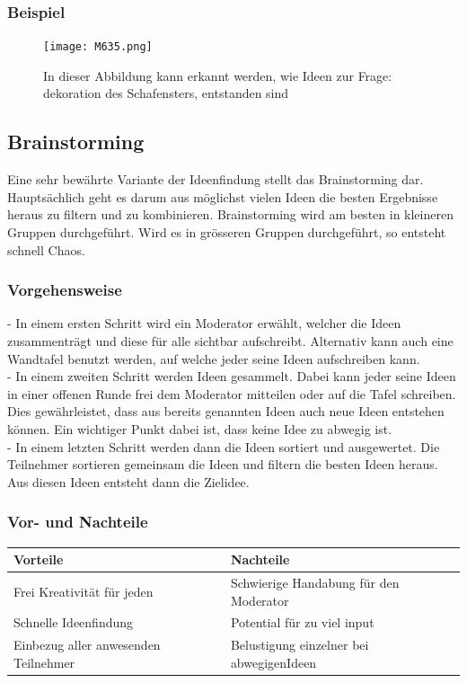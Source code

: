 \subsubsection{Beispiel}
\begin{figure}[H]
	\centering
	\texttt{[image: M635.png]}
	\caption{In dieser Abbildung kann erkannt werden, wie Ideen zur Frage: dekoration des Schafensters, entstanden sind}
\end{figure}
\newpage
\subsection{Brainstorming}\label{subsec:Brainstorming}

Eine sehr bewährte Variante der Ideenfindung stellt das Brainstorming dar. Hauptsächlich geht es darum aus möglichst vielen Ideen die besten Ergebnisse heraus zu filtern und zu kombinieren. Brainstorming wird am besten in kleineren Gruppen durchgeführt. Wird es in grösseren Gruppen durchgeführt, so entsteht schnell Chaos.

\subsubsection{Vorgehensweise}

- In einem ersten Schritt wird ein Moderator erwählt, welcher die Ideen zusammenträgt und diese für alle sichtbar aufschreibt. Alternativ kann auch eine Wandtafel benutzt werden, auf welche jeder seine Ideen aufschreiben kann.\\
- In einem zweiten Schritt werden Ideen gesammelt. Dabei kann jeder seine Ideen in einer offenen Runde frei dem Moderator mitteilen oder auf die Tafel schreiben. Dies gewährleistet, dass aus bereits genannten Ideen auch neue Ideen entstehen können. Ein wichtiger Punkt dabei ist, dass keine Idee zu abwegig ist. \\
- In einem letzten Schritt werden dann die Ideen sortiert und ausgewertet. Die Teilnehmer sortieren gemeinsam die Ideen und filtern die besten Ideen heraus. Aus diesen Ideen entsteht dann die Zielidee. 

\subsubsection{Vor- und Nachteile}

\begin{tabular}{|l|l|}
	\hline 
	\textbf{Vorteile} & \textbf{Nachteile} \\ 
	\hline 
	Frei Kreativität für jeden & Schwierige Handabung für den Moderator  \\
	\hline 
	Schnelle Ideenfindung & Potential für zu viel input \\ 
	\hline 
	Einbezug aller anwesenden Teilnehmer & Belustigung einzelner bei \flqq abwegigen\frqq  Ideen\\
	\hline
\end{tabular} 


